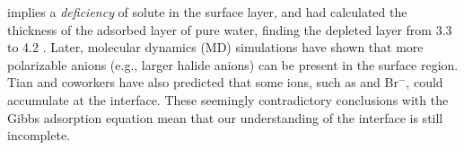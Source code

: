 implies a \emph{deficiency} of solute in the surface layer\cite{Jarvis1968},
and had calculated the thickness of the adsorbed layer of pure water, finding 
the depleted layer from 3.3 to 4.2 \A.
Later, molecular dynamics (MD) simulations have shown that more polarizable anions (e.g., larger halide anions) 
can be present in the surface region\cite{Jungwirth2001,Jungwirth2002}. 
Tian and coworkers\cite{CST11} have also predicted that some ions, such as \I and Br$^{-}$, could accumulate at the interface.
These seemingly contradictory conclusions with the Gibbs adsorption equation mean that our understanding of the interface is still incomplete. 

%

